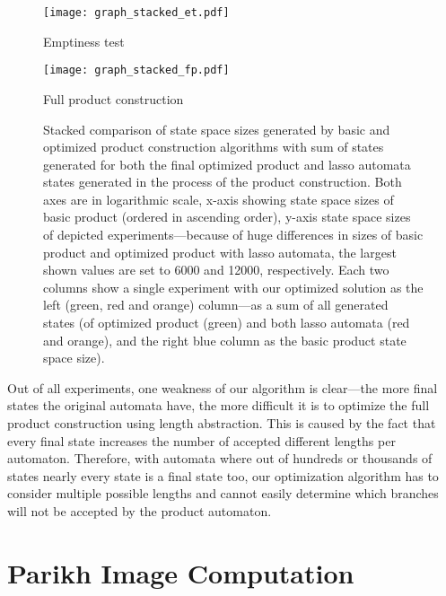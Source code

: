 \begin{figure*}[ht]
    \centering
    \begin{minipage}{0.49\linewidth}
        \centering
        \texttt{[image: graph\_stacked\_et.pdf]}
        \caption{Emptiness test}
        \label{fig:graph:stacked_et_state_space_sizes_comp_with_lasso}
    \end{minipage}
    \hfill
    \begin{minipage}{0.49\linewidth}
        \centering
        \texttt{[image: graph\_stacked\_fp.pdf]}
        \caption{Full product construction}
        \label{fig:graph:stacked_fp_state_space_sizes_comp_with_lasso}
    \end{minipage}
    \vspace{0.5cm}
    \caption{Stacked comparison of state space sizes generated by basic and optimized product construction algorithms with sum of states generated for both the final optimized product and lasso automata states generated in the process of the product construction. Both axes are in logarithmic scale, x-axis showing state space sizes of basic product (ordered in ascending order), y-axis state space sizes of depicted experiments---because of huge differences in sizes of basic product and optimized product with lasso automata, the largest shown values are set to 6000 and 12000, respectively. Each two columns show a single experiment with our optimized solution as the left (green, red and orange) column---as a sum of all generated states (of optimized product (green) and both lasso automata (red and orange), and the right blue column as the basic product state space size).}
    \label{fig:graph:stacked_product_state_space_sizes_with_lasso}
\end{figure*}

Out of all experiments, one weakness of our algorithm is clear---the more final states the original automata have, the more difficult it is to optimize the full product construction using length abstraction. This is caused by the fact that every final state increases the number of accepted different lengths per automaton. Therefore, with automata where out of hundreds or thousands of states nearly every state is a final state too, our optimization algorithm has to consider multiple possible lengths and cannot easily determine which branches will not be accepted by the product automaton.

\section{Parikh Image Computation}

